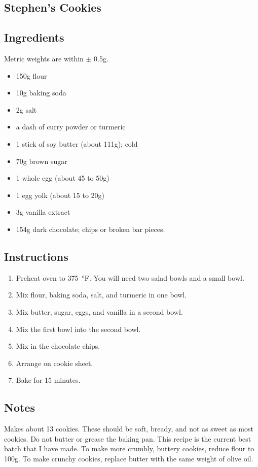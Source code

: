 \documentclass[12pt, letterpaper]{article}
\begin{document}
\thispagestyle{empty}
\twocolumn

\begin{flushleft}
\section*{Stephen's Cookies}
\subsection*{Ingredients}
Metric weights are within $\pm$ 0.5g.

\begin{itemize}
\item 150g flour
\item 10g baking soda
\item 2g salt
\item a dash of curry powder or turmeric
\item 1 stick of soy butter (about 111g); cold
\item 70g brown sugar
\item 1 whole egg (about 45 to 50g)
\item 1 egg yolk (about 15 to 20g)
\item 3g vanilla extract
\item 154g dark chocolate; chips or broken bar pieces.
\end{itemize}

\subsection*{Instructions}
\begin{enumerate}
\item Preheat oven to \SI{375}{\degree}F. You will need two salad bowls and a small bowl.
\item Mix flour, baking soda, salt, and turmeric in one bowl.
\item Mix butter, sugar, eggs, and vanilla in a second bowl.
\item Mix the first bowl into the second bowl.
\item Mix in the chocolate chips.
\item Arrange on cookie sheet.
\item Bake for 15 minutes.
\end{enumerate}


\subsection*{Notes}
Makes about 13 cookies. These should be soft, bready, and not as sweet as most cookies. Do not butter or grease the baking pan. This recipe is the current best batch that I have made. To make more crumbly, buttery cookies, reduce flour to 100g. To make crunchy cookies, replace butter with the same weight of olive oil.


\end{flushleft}
\end{document}
